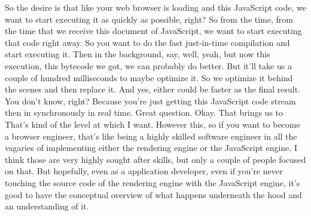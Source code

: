 So the desire is that like your web browser is loading and this JavaScript code, we want to start executing it as quickly as possible, right? So from the time, from the time that we receive this document of JavaScript, we want to start executing that code right away. So you want to do the fast just-in-time compilation and start executing it. Then in the background, say, well, yeah, but now this execution, this bytecode we got, we can probably do better. But it'll take us a couple of hundred milliseconds to maybe optimize it. So we optimize it behind the scenes and then replace it. And yes, either could be faster as the final result. You don't know, right? Because you're just getting this JavaScript code stream then in synchronously in real time. Great question. Okay. That brings us to That's kind of the level at which I want. However this, so if you want to become a browser engineer, that's like being a highly skilled software engineer in all the vagaries of implementing either the rendering engine or the JavaScript engine. I think those are very highly sought after skills, but only a couple of people focused on that. But hopefully, even as a application developer, even if you're never touching the source code of the rendering engine with the JavaScript engine, it's good to have the conceptual overview of what happens underneath the hood and an understanding of it.

